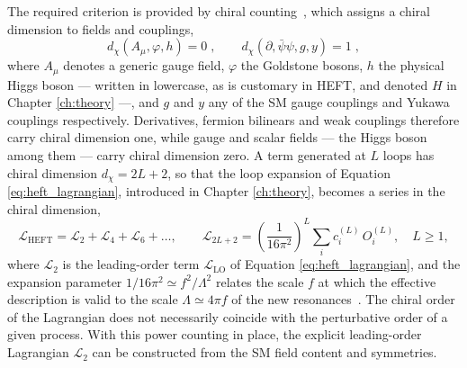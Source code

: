 The required criterion is provided by chiral counting~\cite{Buchalla:2013rka,Buchalla:2013eza}, which assigns a chiral dimension to fields and couplings,
%
\begin{equation}
    d_\chi(A_\mu,\varphi,h) = 0\;, \qquad
    d_\chi(\partial,\bar{\psi}\psi,g,y) = 1\;,
\label{eq:chiral_dim}
\end{equation}
%
where $A_\mu$ denotes a generic gauge field, $\varphi$ the Goldstone bosons, $h$ the physical Higgs boson — written in lowercase, as is customary in HEFT, and denoted $H$ in Chapter \ref{ch:theory} —, and $g$ and $y$ any of the SM gauge couplings and Yukawa couplings respectively. Derivatives, fermion bilinears and weak couplings therefore carry chiral dimension one, while gauge and scalar fields — the Higgs boson among them — carry chiral dimension zero. A term generated at $L$ loops has chiral dimension $d_\chi = 2L+2$, so that the loop expansion of Equation \ref{eq:heft_lagrangian}, introduced in Chapter \ref{ch:theory}, becomes a series in the chiral dimension,
%
\begin{equation}
    \mathcal{L}_{\text{HEFT}} = \mathcal{L}_2 + \mathcal{L}_4 + \mathcal{L}_6 + \dots, \qquad
    \mathcal{L}_{2L+2} = \left(\frac{1}{16\pi^2}\right)^{L}\sum_i c_i^{(L)}\,O_i^{(L)}, \quad L\geq1,
\label{eq:heft_expansion}
\end{equation}
%
where $\mathcal{L}_2$ is the leading-order term $\mathcal{L}_{\text{LO}}$ of Equation \ref{eq:heft_lagrangian}, and the expansion parameter $1/16\pi^2 \simeq f^2/\Lambda^2$ relates the scale $f$ at which the effective description is valid to the scale $\Lambda\simeq4\pi f$ of the new resonances~\cite{Heinrich:2022huh}. The chiral order of the Lagrangian does not necessarily coincide with the perturbative order of a given process. With this power counting in place, the explicit leading-order Lagrangian $\mathcal{L}_2$ can be constructed from the SM field content and symmetries.




